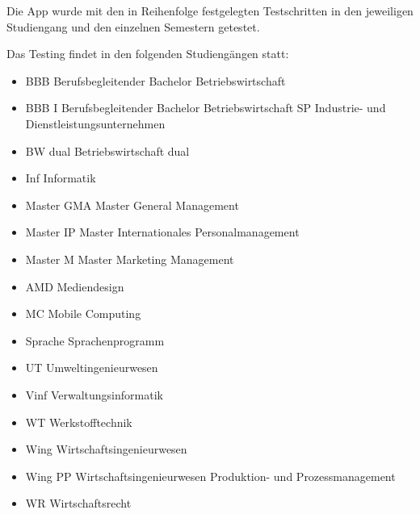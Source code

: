 Die App wurde mit den in Reihenfolge festgelegten Testschritten in den jeweiligen Studiengang und den einzelnen Semestern getestet.\newline
\newline

Das Testing  findet in den  folgenden Studiengängen statt:

\begin{itemize}
\item BBB  Berufsbegleitender Bachelor Betriebswirtschaft
\item BBB I  Berufsbegleitender Bachelor Betriebswirtschaft SP Industrie- und Dienstleistungsunternehmen
\item BW dual  Betriebswirtschaft dual
\item Inf  Informatik
\item Master GMA  Master General Management
\item Master IP  Master Internationales Personalmanagement
\item Master M  Master Marketing Management
\item AMD  Mediendesign
\item MC  Mobile Computing
\item Sprache  Sprachenprogramm
\item UT  Umweltingenieurwesen
\item Vinf  Verwaltungsinformatik
\item WT  Werkstofftechnik
\item Wing  Wirtschaftsingenieurwesen
\item Wing PP  Wirtschaftsingenieurwesen Produktion- und Prozessmanagement
\item WR  Wirtschaftsrecht
\end{itemize}




